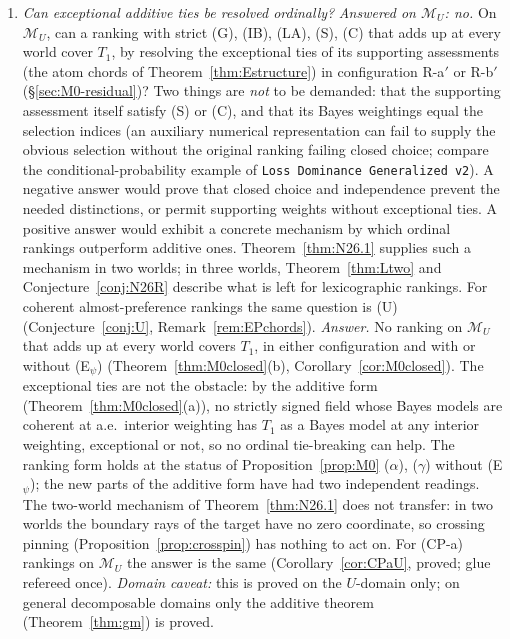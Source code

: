 \documentclass[11pt]{article}
\theoremstyle{definition}
\theoremstyle{remark}
\newcommand{\M}{\mathcal M}
\newcommand{\src}[1]{\texttt{#1}}
\begin{document}
\begin{enumerate}[leftmargin=*,label=\textbf{(Q\arabic*)}]
\item \emph{Can exceptional additive ties be resolved ordinally?} \emph{Answered on $\M_U$: no.} On $\M_U$, can a ranking with strict (G), (IB), (LA), (S), (C) that adds up at every world cover $T_1$, by resolving the exceptional ties of its supporting assessments (the atom chords of Theorem~\ref{thm:Estructure}) in configuration R-a$'$ or R-b$'$ (\S\ref{sec:M0-residual})? Two things are \emph{not} to be demanded: that the supporting assessment itself satisfy (S) or (C), and that its Bayes weightings equal the selection indices (an auxiliary numerical representation can fail to supply the obvious selection without the original ranking failing closed choice; compare the conditional-probability example of \src{Loss Dominance Generalized v2}). A negative answer would prove that closed choice and independence prevent the needed distinctions, or permit supporting weights without exceptional ties. A positive answer would exhibit a concrete mechanism by which ordinal rankings outperform additive ones. Theorem~\ref{thm:N26.1} supplies such a mechanism in two worlds; in three worlds, Theorem~\ref{thm:Ltwo} and Conjecture~\ref{conj:N26R} describe what is left for lexicographic rankings. For coherent almost-preference rankings the same question is (U) (Conjecture~\ref{conj:U}, Remark~\ref{rem:EPchords}).
\emph{Answer.} No ranking on $\M_U$ that adds up at every world covers $T_1$, in either configuration and with or without (E$_\psi$) (Theorem~\ref{thm:M0closed}(b), Corollary~\ref{cor:M0closed}). The exceptional ties are not the obstacle: by the additive form (Theorem~\ref{thm:M0closed}(a)), no strictly signed field whose Bayes models are coherent at a.e.\ interior weighting has $T_1$ as a Bayes model at any interior weighting, exceptional or not, so no ordinal tie-breaking can help. The ranking form holds at the status of Proposition~\ref{prop:M0} ($\alpha$), ($\gamma$) without (E$_\psi$); the new parts of the additive form have had two independent readings. The two-world mechanism of Theorem~\ref{thm:N26.1} does not transfer: in two worlds the boundary rays of the target have no zero coordinate, so crossing pinning (Proposition~\ref{prop:crosspin}) has nothing to act on. For (CP-a) rankings on $\M_U$ the answer is the same (Corollary~\ref{cor:CPaU}, proved; glue refereed once). \emph{Domain caveat:} this is proved on the $U$-domain only; on general decomposable domains only the additive theorem (Theorem~\ref{thm:gm}) is proved.

\end{enumerate}
\end{document}
